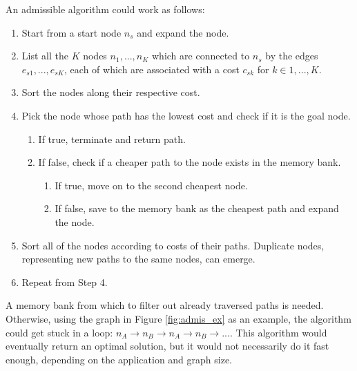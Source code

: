 An admissible algorithm could work as follows:

\begin{enumerate}
	\item Start from a start node $n_{s}$ and expand the node.
	\item List all the $K$ nodes $n_{1}, ..., n_{K}$  which are connected to $n_{s}$ by the edges $e_{s1}, ..., e_{sK}$, each of which are associated with a cost $c_{sk}$ for $k \in 1, ..., K$.
	\item Sort the nodes along their respective cost.
	\item Pick the node whose path has the lowest cost and check if it is the goal node. \begin{enumerate}
		\item If true, terminate and return path.
		\item If false, check if a cheaper path to the node exists in the memory bank.
		\begin{enumerate}
			\item If true, move on to the second cheapest node.
			\item If false, save to the memory bank as the cheapest path and expand the node.
		\end{enumerate}
	\end{enumerate}
	\item Sort all of the nodes according to costs of their paths. Duplicate nodes, representing new paths to the same nodes, can emerge.
	\item Repeat from Step 4.
\end{enumerate}
 
A memory bank from which to filter out already traversed paths is needed. Otherwise, using the graph in Figure \ref{fig:admis_ex} as an example, the algorithm could get stuck in a loop: $n_A \rightarrow n_B \rightarrow n_A \rightarrow n_B \rightarrow ...$. This algorithm would eventually return an optimal solution, but it would not necessarily do it fast enough, depending on the application and graph size.

%		
%		

